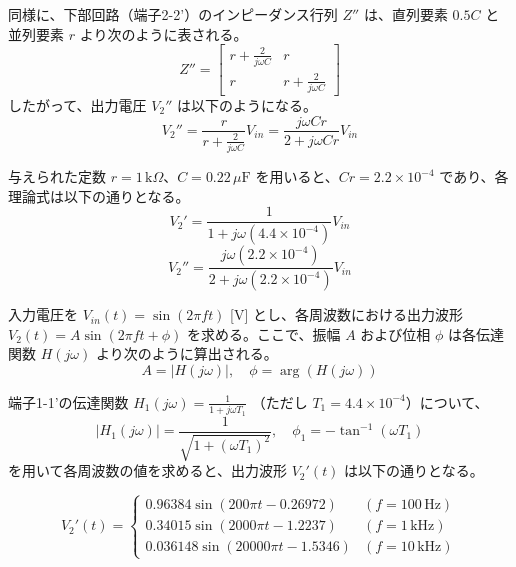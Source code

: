 \documentclass[article]{jlreq}
\begin{document}
同様に、下部回路（端子2-2'）のインピーダンス行列 $Z''$ は、直列要素 $0.5C$ と並列要素 $r$ より次のように表される。
\begin{equation}
Z'' = \begin{bmatrix} r + \frac{2}{j\omega C} & r \\ r & r + \frac{2}{j\omega C} \end{bmatrix}
\end{equation}
したがって、出力電圧 $V_2''$ は以下のようになる。
\begin{equation}
V_2'' = \frac{r}{r + \frac{2}{j\omega C}} V_{in} = \frac{j\omega Cr}{2 + j\omega Cr} V_{in}
\end{equation}

与えられた定数 $r = 1\,\text{k}\Omega$、$C = 0.22\,\mu\text{F}$ を用いると、$Cr = 2.2 \times 10^{-4}$ であり、各理論式は以下の通りとなる。
\begin{equation}
V_2' = \frac{1}{1 + j\omega (4.4 \times 10^{-4})} V_{in}
\end{equation}
\begin{equation}
V_2'' = \frac{j\omega (2.2 \times 10^{-4})}{2 + j\omega (2.2 \times 10^{-4})} V_{in}
\end{equation}

入力電圧を $V_{in}(t) = \sin(2\pi f t)$ [V] とし、各周波数における出力波形 $V_{2}(t) = A \sin(2\pi f t + \phi)$ を求める。ここで、振幅 $A$ および位相 $\phi$ は各伝達関数 $H(j\omega)$ より次のように算出される。
\begin{equation}
A = |H(j\omega)|, \quad \phi = \arg(H(j\omega))
\end{equation}

端子1-1'の伝達関数 $H_1(j\omega) = \frac{1}{1 + j\omega T_1}$ （ただし $T_1 = 4.4 \times 10^{-4}$）について、
\begin{equation}
|H_1(j\omega)| = \frac{1}{\sqrt{1 + (\omega T_1)^2}}, \quad \phi_1 = -\tan^{-1}(\omega T_1)
\end{equation}
を用いて各周波数の値を求めると、出力波形 $V_2'(t)$ は以下の通りとなる。

\begin{equation}
V_2'(t) = \begin{cases} 
0.96384 \sin(200\pi t - 0.26972) & (f = 100\,\text{Hz}) \\
0.34015 \sin(2000\pi t - 1.2237) & (f = 1\,\text{kHz}) \\
0.036148 \sin(20000\pi t - 1.5346) & (f = 10\,\text{kHz})
\end{cases}
\end{equation}
\end{document}
